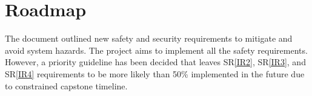 \documentclass{article}
\begin{document}
\section{Roadmap}

The document outlined new safety and security requirements to mitigate and avoid system hazards. The project aims to implement all the safety requirements. However, a priority guideline has been decided that leaves SR\ref{IR2}, SR\ref{IR3}, and SR\ref{IR4} requirements to be more likely than 50\% implemented in the future due to constrained capstone timeline. 



\end{document}
